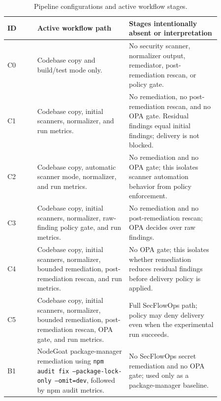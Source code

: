 \begin{table}[t]
\centering
\footnotesize
\caption{Pipeline configurations and active workflow stages.}
\label{tab:configs}
\begin{tabular}{@{}lp{0.43\linewidth}p{0.43\linewidth}@{}}
\toprule
ID & Active workflow path & Stages intentionally absent or interpretation \\
\midrule
C0 & Codebase copy and build/test mode only. & No security scanner, normalizer output, remediator, post-remediation rescan, or policy gate. \\
C1 & Codebase copy, initial scanners, normalizer, and run metrics. & No remediation, no post-remediation rescan, and no OPA gate. Residual findings equal initial findings; delivery is not blocked. \\
C2 & Codebase copy, automatic scanner mode, normalizer, and run metrics. & No remediation and no OPA gate; this isolates scanner automation behavior from policy enforcement. \\
C3 & Codebase copy, initial scanners, normalizer, raw-finding policy gate, and run metrics. & No remediation and no post-remediation rescan; OPA decides over raw findings. \\
C4 & Codebase copy, initial scanners, normalizer, bounded remediation, post-remediation rescan, and run metrics. & No OPA gate; this isolates whether remediation reduces residual findings before delivery policy is applied. \\
C5 & Codebase copy, initial scanners, normalizer, bounded remediation, post-remediation rescan, OPA gate, and run metrics. & Full SecFlowOps path; policy may deny delivery even when the experimental run succeeds. \\
B1 & NodeGoat package-manager remediation using \texttt{npm audit fix --package-lock-only --omit=dev}, followed by npm audit metrics. & No SecFlowOps secret remediation and no OPA gate; used only as a package-manager baseline. \\
\bottomrule
\end{tabular}
\end{table}

